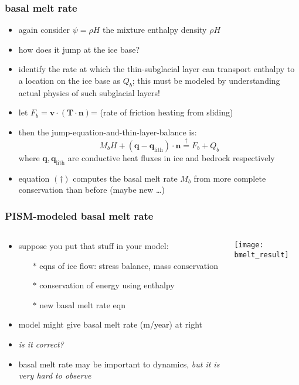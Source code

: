 \documentclass{beamer}
\newcommand{\bn}{\mathbf{n}}
\newcommand{\bq}{\mathbf{q}}
\newcommand{\bv}{\mathbf{v}}
\begin{document}
\begin{frame}
  \frametitle{basal melt rate}

\begin{itemize}
\item again consider $\psi=\rho H$ the mixture enthalpy density $\rho H$
\item how does it jump at the ice base?
\item identify the rate at which the thin-subglacial layer can transport enthalpy to a location on the ice base as $Q_b$; this must be modeled by understanding actual physics of such subglacial layers!
\item let $F_b = \bv \cdot (\mathbf{T}\cdot \mathbf{n})$= (rate of friction heating from sliding)
\item then the jump-equation-and-thin-layer-balance is:
\begin{equation*}
M_b H + \left(\bq - \bq_{\text{lith}}\right)\cdot \bn \stackrel{\dagger}{=} F_b + Q_b
\end{equation*}
where $\bq,\bq_{\text{lith}}$ are conductive heat fluxes in ice and bedrock respectively
\item equation $(\dagger)$ \alert{computes the basal melt rate} $M_b$ from more complete conservation than before (maybe new \dots)
\end{itemize}
\end{frame}


\begin{frame}
  \frametitle{PISM-modeled basal melt rate}

\begin{columns}
\begin{column}{0.6\textwidth}
\begin{itemize}
\item suppose you put that stuff in your model:
  \begin{itemize}
  \item[$\ast$] eqns of ice flow: stress balance, mass conservation
  \item[$\ast$] conservation of energy using enthalpy
  \item[$\ast$] new basal melt rate eqn
  \end{itemize}
\item model might give basal melt rate (m/year) at right
\item \emph{is it correct?}
\item basal melt rate may be important to dynamics, \emph{but it is very hard to observe}
\end{itemize}
\end{column}
\begin{column}{0.4\textwidth}
\begin{center}
    \texttt{[image: bmelt\_result]}
  \end{center}
\end{column}
\end{columns}
\end{frame}
\end{document}
